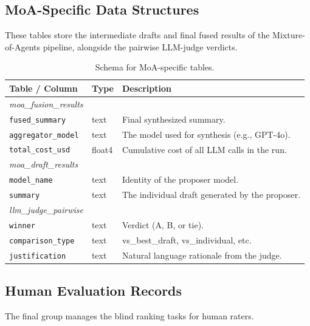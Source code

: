 \subsection{MoA-Specific Data Structures}

These tables store the intermediate drafts and final fused results of the 
Mixture-of-Agents pipeline, alongside the pairwise LLM-judge verdicts.

\begin{table}[H]
\centering
\caption{Schema for MoA-specific tables.}
\begin{tabular}{lll}
\hline
\textbf{Table / Column} & \textbf{Type} & \textbf{Description} \\ \hline
\textit{moa\_fusion\_results} & & \\
\texttt{fused\_summary} & text & Final synthesized summary. \\
\texttt{aggregator\_model} & text & The model used for synthesis (e.g., GPT-4o). \\
\texttt{total\_cost\_usd} & float4 & Cumulative cost of all LLM calls in the run. \\ \hline
\textit{moa\_draft\_results} & & \\
\texttt{model\_name} & text & Identity of the proposer model. \\
\texttt{summary} & text & The individual draft generated by the proposer. \\ \hline
\textit{llm\_judge\_pairwise} & & \\
\texttt{winner} & text & Verdict (A, B, or tie). \\
\texttt{comparison\_type} & text & vs\_best\_draft, vs\_individual, etc. \\
\texttt{justification} & text & Natural language rationale from the judge. \\ \hline
\end{tabular}
\end{table}

\subsection{Human Evaluation Records}

The final group manages the blind ranking tasks for human raters.

